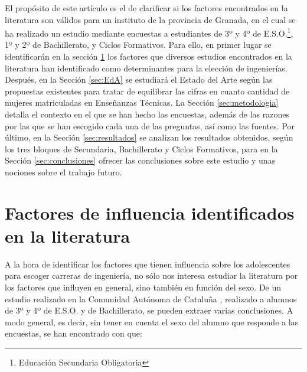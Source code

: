 \documentclass[runningheads,a4paper]{llncs}
\begin{document}
El propósito de este artículo es el de clarificar si los factores encontrados en la literatura son válidos para un instituto de la provincia de Granada, en el cual se ha realizado un estudio mediante encuestas a estudiantes de 3º y 4º de E.S.O.\footnote{Educación Secundaria Obligatoria}, 1º y 2º de Bachillerato, y Ciclos Formativos. Para ello, en primer lugar se identificarán en la sección \ref{sec:factores} los factores que diversos estudios encontrados en la literatura han identificado como determinantes para la elección de ingenierías. Después, en la Sección \ref{sec:EdA} se estudiará el Estado del Arte según las propuestas existentes para tratar de equilibrar las cifras en cuanto cantidad de mujeres matriculadas en Enseñanzas Técnicas. La Sección \ref{sec:metodologia} detalla el contexto en el que se han hecho las encuestas, además de las razones por las que se han escogido cada una de las preguntas, así como las fuentes. Por último, en la Sección \ref{sec:resultados} se analizan los resultados obtenidos, según los tres bloques de Secundaria, Bachillerato y Ciclos Formativos, para en la Sección \ref{sec:conclusiones} ofrecer las conclusiones sobre este estudio y unas nociones sobre el trabajo futuro.

\section{Factores de influencia identificados en la literatura}
\label{sec:factores}

A la hora de identificar los factores que tienen influencia sobre los adolescentes para escoger carreras de ingeniería, no sólo nos interesa estudiar la literatura por los factores que influyen en general, sino también en función del sexo. De un estudio realizado en la Comunidad Autónoma de Cataluña \cite{everis2012}, realizado a alumnos de 3º y 4º de E.S.O. y de Bachillerato, se pueden extraer varias conclusiones. A modo general, es decir, sin tener en cuenta el sexo del alumno que responde a las encuestas, se han encontrado con que:
\end{document}
